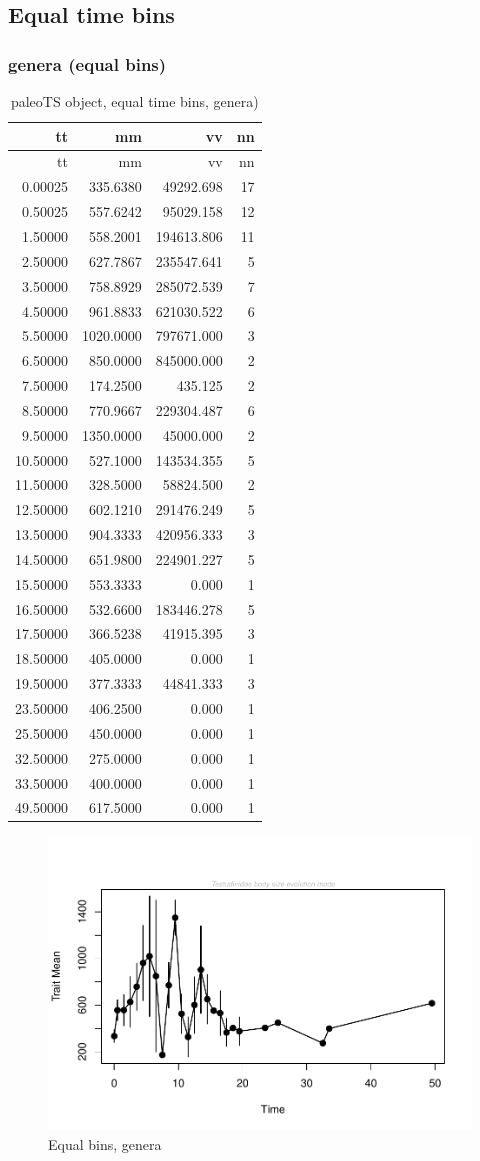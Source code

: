 \documentclass[]{article}
\begin{document}
\newpage

\subsection{Equal time bins}\label{equal-time-bins}

\subsubsection{genera (equal bins)}\label{genera-equal-bins}

\begin{longtable}[]{@{}rrrr@{}}
\caption{paleoTS object, equal time bins, genera)}\tabularnewline
\toprule
tt & mm & vv & nn\tabularnewline
\midrule
\endfirsthead
\toprule
tt & mm & vv & nn\tabularnewline
\midrule
\endhead
0.00025 & 335.6380 & 49292.698 & 17\tabularnewline
0.50025 & 557.6242 & 95029.158 & 12\tabularnewline
1.50000 & 558.2001 & 194613.806 & 11\tabularnewline
2.50000 & 627.7867 & 235547.641 & 5\tabularnewline
3.50000 & 758.8929 & 285072.539 & 7\tabularnewline
4.50000 & 961.8833 & 621030.522 & 6\tabularnewline
5.50000 & 1020.0000 & 797671.000 & 3\tabularnewline
6.50000 & 850.0000 & 845000.000 & 2\tabularnewline
7.50000 & 174.2500 & 435.125 & 2\tabularnewline
8.50000 & 770.9667 & 229304.487 & 6\tabularnewline
9.50000 & 1350.0000 & 45000.000 & 2\tabularnewline
10.50000 & 527.1000 & 143534.355 & 5\tabularnewline
11.50000 & 328.5000 & 58824.500 & 2\tabularnewline
12.50000 & 602.1210 & 291476.249 & 5\tabularnewline
13.50000 & 904.3333 & 420956.333 & 3\tabularnewline
14.50000 & 651.9800 & 224901.227 & 5\tabularnewline
15.50000 & 553.3333 & 0.000 & 1\tabularnewline
16.50000 & 532.6600 & 183446.278 & 5\tabularnewline
17.50000 & 366.5238 & 41915.395 & 3\tabularnewline
18.50000 & 405.0000 & 0.000 & 1\tabularnewline
19.50000 & 377.3333 & 44841.333 & 3\tabularnewline
23.50000 & 406.2500 & 0.000 & 1\tabularnewline
25.50000 & 450.0000 & 0.000 & 1\tabularnewline
32.50000 & 275.0000 & 0.000 & 1\tabularnewline
33.50000 & 400.0000 & 0.000 & 1\tabularnewline
49.50000 & 617.5000 & 0.000 & 1\tabularnewline
\bottomrule
\end{longtable}

\begin{figure}[htbp]
\centering
\includegraphics{MA_JJ_files/figure-latex/Play around with time bins, generic level-1.pdf}
\caption{Equal bins, genera}
\end{figure}
\end{document}
